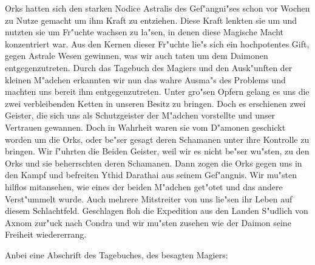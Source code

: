 \documentclass[a5paper,8pt]{book}
\begin{document}
Orks hatten sich den starken Nodice Astralis des Gef"angni"ses schon vor Wochen zu Nutze gemacht um ihm Kraft zu entziehen. Diese Kraft lenkten sie um und nutzten sie um Fr"uchte wachsen zu la"sen, in denen diese Magische Macht konzentriert war. Aus den Kernen dieser Fr"uchte lie"s sich ein hochpotentes Gift, gegen Astrale Wesen gewinnen, was wir auch taten um dem Daimonen entgegenzutreten.
Durch das Tagebuch des Magiers und den Ausk"unften der kleinen M"adchen erkannten wir nun das wahre Ausma"s des Problems und machten uns bereit ihm entgegenzutreten. Unter gro"sen Opfern gelang es uns die zwei verbleibenden Ketten in unseren Besitz zu bringen. Doch es erschienen zwei Geister, die sich uns als Schutzgeister der M"adchen vorstellte und unser Vertrauen gewannen. Doch in Wahrheit waren sie vom D"amonen geschickt worden um die Orks, oder be"ser gesagt deren Schamanen unter ihre Kontrolle zu bringen. Wir f"uhrten die Beiden Geister, weil wir es nicht be"ser wu"sten, zu den Orks und sie beherrschten deren Schamanen. Dann zogen die Orks gegen uns in den Kampf und befreiten Ythid Darathai aus seinem Gef"angnis. Wir mu"sten hilflos mitansehen, wie eines der beiden M"adchen get"otet und das andere Verst"ummelt wurde. Auch mehrere Mitstreiter von uns lie"sen ihr Leben auf diesem Schlachtfeld.
Geschlagen floh die Expedition aus den Landen S"udlich von Axnom zur"uck nach Condra und wir mu"sten zusehen wie der Daimon seine Freiheit wiedererrang.

\newpage


Anbei eine Abschrift des Tagebuches, des besagten Magiers:

\vspace{5mm}
\end{document}
